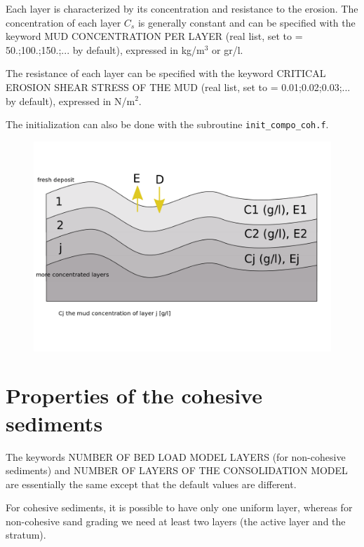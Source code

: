 Each layer is characterized by its concentration and resistance to the erosion. The concentration of each layer $C_s$ is generally constant and can be specified with the keyword {\ttfamily MUD CONCENTRATION PER LAYER} (real list, set to {\ttfamily = 50.;100.;150.;...} by default), expressed in kg/m$^3$ or gr/l.

The resistance of each layer can be specified with the keyword {\ttfamily CRITICAL EROSION SHEAR STRESS OF THE MUD} (real list, set to {\ttfamily = 0.01;0.02;0.03;...} by default), expressed in N/m$^2$.

The initialization can also be done with the subroutine \texttt{init\_compo\_coh.f}.

\begin{figure}[H]%
\begin{center}
\includegraphics[scale=0.3]{./graphics/consolidation.png}
\end{center}
\end{figure}

\section{Properties of the cohesive sediments}
The keywords {\ttfamily NUMBER OF BED LOAD MODEL LAYERS} (for non-cohesive sediments) and {\ttfamily NUMBER OF LAYERS OF THE CONSOLIDATION MODEL} are essentially the same except that the default values are different.

For cohesive sediments, it is possible to have only one uniform layer, whereas for non-cohesive sand grading we need at least two layers (the active layer and the stratum).


